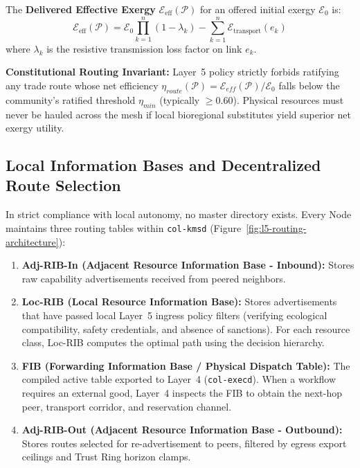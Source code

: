 The \textbf{Delivered Effective Exergy} $\mathcal{E}_{\mathrm{eff}}(\mathcal{P})$ for an offered initial exergy $\mathcal{E}_0$ is:
\begin{equation}
\mathcal{E}_{\mathrm{eff}}(\mathcal{P}) = \mathcal{E}_0 \prod_{k=1}^n (1 - \lambda_k) - \sum_{k=1}^n \mathcal{E}_{\mathrm{transport}}(e_k)
\label{eq:effective_exergy}
\end{equation}
where $\lambda_k$ is the resistive transmission loss factor on link $e_k$.

\textbf{Constitutional Routing Invariant:} Layer~5 policy strictly forbids ratifying any trade route whose net efficiency $\eta_{route}(\mathcal{P}) = \mathcal{E}_{eff}(\mathcal{P}) / \mathcal{E}_0$ falls below the community's ratified threshold $\eta_{min}$ (typically $\ge 0.60$). Physical resources must never be hauled across the mesh if local bioregional substitutes yield superior net exergy utility.

\subsection{Local Information Bases and Decentralized Route Selection}

In strict compliance with local autonomy, no master directory exists. Every Node maintains three routing tables within \texttt{col-kmsd} (Figure~\ref{fig:l5-routing-architecture}):
\begin{enumerate}
  \item \textbf{Adj-RIB-In (Adjacent Resource Information Base - Inbound):} Stores raw capability advertisements received from peered neighbors.
  \item \textbf{Loc-RIB (Local Resource Information Base):} Stores advertisements that have passed local Layer~5 ingress policy filters (verifying ecological compatibility, safety credentials, and absence of sanctions). For each resource class, Loc-RIB computes the optimal path using the decision hierarchy.
  \item \textbf{FIB (Forwarding Information Base / Physical Dispatch Table):} The compiled active table exported to Layer~4 (\texttt{col-execd}). When a workflow requires an external good, Layer~4 inspects the FIB to obtain the next-hop peer, transport corridor, and reservation channel.
  \item \textbf{Adj-RIB-Out (Adjacent Resource Information Base - Outbound):} Stores routes selected for re-advertisement to peers, filtered by egress export ceilings and Trust Ring horizon clamps.
\end{enumerate}

